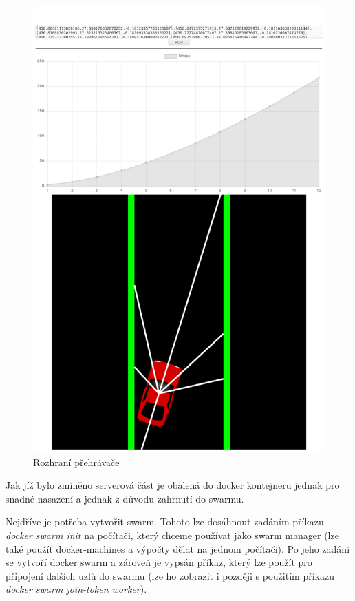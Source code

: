 \begin{figure}[H]
	\centering
	\includegraphics[width=0.5\linewidth]{player}
	\caption{Rozhraní přehrávače}
	\label{fig:player}
\end{figure}


Jak jíž bylo zmíněno serverová část je obalená do docker kontejneru jednak pro snadné nasazení a jednak z důvodu zahrnutí do swarmu.	

Nejdříve je potřeba vytvořit swarm. Tohoto lze dosáhnout zadáním příkazu \emph{docker swarm init} na počítači, který chceme používat jako swarm manager (lze také použít docker-machines a výpočty dělat na jednom počítači). Po jeho zadání se vytvoří docker swarm a zároveň je vypsán příkaz, který lze použít pro připojení dalších uzlů do swarmu (lze ho zobrazit i později s použitím příkazu \emph{docker swarm join-token worker}).

